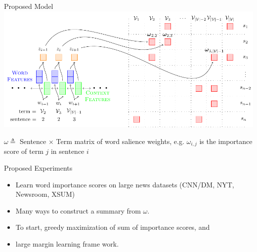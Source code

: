 \begin{frame}{Proposed Model}
\includegraphics[scale=.6]{images/section3/4_2_wimp_model.pdf}

    $\omega \triangleq $ Sentence $\times$ Term matrix of word salience 
    weights, e.g. $\omega_{i,j}$ is the importance score of term $j$ 
    in sentence $i$ \\




\end{frame}

\begin{frame}{Proposed Experiments}
\begin{itemize}
   \item Learn word importance scores on large news datasets (CNN/DM, NYT, Newsroom, XSUM)
    \item Many ways to construct a summary from $\omega$.
    \item To start, greedy maximization of sum of importance scores, and
    \item large margin learning frame work.

\end{itemize}
\end{frame}


